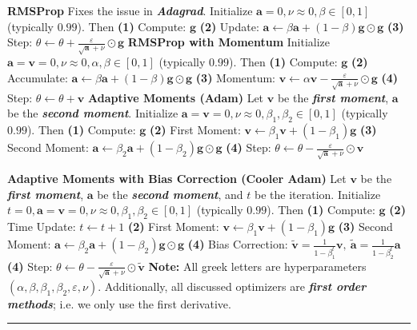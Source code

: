 \documentclass{article}
\renewcommand{\v}{\bf{v}}
\renewcommand{\a}{\bf{a}}
\newcommand{\g}{\bf{g}}
\newcommand{\ot}{\leftarrow}
\renewcommand{\bf}[1]{\textbf{{#1}}}
\newcommand{\ib}[1]{\textit{\textbf{{#1}}}}
\newcommand{\eps}{\varepsilon}
\begin{document}
\begin{small}
\newline
\bf{RMSProp}
\newline
Fixes the issue in \ib{Adagrad}. Initialize $\a = 0, \nu \approx 0, \beta \in [0, 1]$ (typically
$0.99$). Then
\newline
\bf{(1)} Compute: $\g$
\bf{(2)} Update: $\a \ot \beta \a + (1 - \beta) \g \odot \g$
\bf{(3)} Step: $\theta \ot \theta + \frac{\eps}{\sqrt{\a} + \nu} \odot \g$
\newline
\bf{RMSProp with Momentum}
\newline
Initialize $\a = \v = 0, \nu \approx 0, \alpha, \beta \in [0, 1]$ (typically $0.99$). Then
\newline
\bf{(1)} Compute: $\g$
\bf{(2)} Accumulate: $\a \ot \beta \a + (1 - \beta) \g \odot \g$
\bf{(3)} Momentum: $\v \ot \alpha \v - \frac{\eps}{\sqrt{\a} + \nu} \odot \g$
\bf{(4)} Step: $\theta \ot \theta + \v$
\newline
\bf{Adaptive Moments (Adam)}
\newline
Let $\v$ be the \ib{first moment}, $\a$ be the \ib{second moment}. Initialize 
$\a = \v = 0, \nu \approx 0, \beta_1, \beta_2 \in [0, 1]$ (typically $0.99$). Then
\newline
\bf{(1)} Compute: $\g$
\bf{(2)} First Moment: $\v \ot \beta_1 \v + (1 - \beta_1) \g$
\newline
\bf{(3)} Second Moment: $\a \ot \beta_2 \a + (1 - \beta_2) \g \odot \g$
\bf{(4)} Step: $\theta \ot \theta - \frac{\eps}{\sqrt{\a} + \nu} \odot \v$

\newpage
\bf{Adaptive Moments with Bias Correction (Cooler Adam)}
\newline
Let $\v$ be the \ib{first moment}, $\a$ be the \ib{second moment}, and $t$ be the iteration. 
Initialize $t = 0, \a = \v = 0, \nu \approx 0, \beta_1, \beta_2 \in [0, 1]$ (typically $0.99$). Then
\newline
\bf{(1)} Compute: $\g$
\bf{(2)} Time Update: $t \ot t + 1$
\bf{(2)} First Moment: $\v \ot \beta_1 \v + (1 - \beta_1) \g$
\newline
\bf{(3)} Second Moment: $\a \ot \beta_2 \a + (1 - \beta_2) \g \odot \g$
\bf{(4)} Bias Correction: 
$
\widetilde{\v} = \frac{1}{1 - \beta_1^t} \v, \
\widetilde{\a} = \frac{1}{1 - \beta_2^t} \a
$
\vspace{-0.3em}
\newline
\bf{(4)} Step: $\theta \ot \theta - \frac{\eps}{\sqrt{\a} + \nu} \odot \widetilde{\v}$
\newline
\bf{Note:} All greek letters are hyperparameters $(\alpha, \beta, \beta_1, \beta_2, \eps, \nu)$.
Additionally, all discussed optimizers are \ib{first order methods}; i.e. we only use the first
derivative.
\hrule
\vspace{0.1em}


\end{small}
\end{document}

